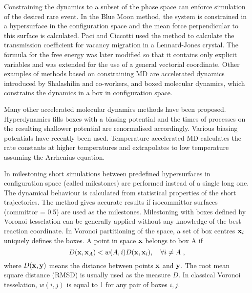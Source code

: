 Constraining the dynamics to a subset of the phase space can enforce simulation of the desired rare event.
In the Blue Moon method,\cite{Carter1989, Paci1991} the system is constrained in a hypersurface in the configuration space and the mean force perpendicular to this surface is calculated.
Paci and Ciccotti used the method to calculate the transmission coefficient for vacancy migration in a Lennard-Jones crystal.\cite{Paci1992}
The formula for the free energy was later modified so that it contains only explicit variables\cite{Sprik1998} and was extended for the use of a general vectorial coordinate.\cite{Ciccotti2005}
Other examples of methods based on constraining MD are accelerated dynamics\cite{Martinez-Nunez2006} introduced by Shalashilin and co-workers, and boxed molecular dynamics,\cite{Glowacki2009} which constrains the dynamics in a box in configuration space.

Many other accelerated molecular dynamics methods have been proposed.
Hyperdynamics\cite{Voter1997} fills boxes with a biasing potential and the times of processes on the resulting shallower potential are renormalised accordingly.
Various biasing potentials have recently been used.\cite{Hamelberg2004, Doshi2012}
Temperature accelerated MD\cite{Sorensen2000} calculates the rate constants at higher temperatures and extrapolates to low temperature assuming the Arrhenius equation.

In milestoning\cite{Faradjian2004} short simulations between predefined hypersurfaces in configuration space (called milestones) are performed instead of a single long one.
The dynamical behaviour is calculated from statistical properties of the short trajectories.
The method gives accurate results if isocommittor surfaces (committor = 0.5) are used as the milestones.\cite{Vanden-Eijnden2008}
Milestoning with boxes defined by Voronoi tesselation\cite{Vanden-Eijnden2009} can be generally applied without any knowledge of the best reaction coordinate.
In Voronoi partitioning of the space, a set of box centres ${\bf x}_i$ uniquely defines the boxes.
A point in space ${\bf x}$ belongs to box A if
\begin{equation} 
\label{eq:voronoi}
D({\bf x},{\bf x}_A) < w(A,i) D({\bf x},{\bf x}_i), ~~~\forall i \neq A ~,
\end{equation}
where $D({\bf x},{\bf y})$ means the distance between points ${\bf x}$ and ${\bf y}$.
The root mean square distance (RMSD) is usually used as the measure $D$.
In classical Voronoi tesselation, $w(i,j)$ is equal to 1 for any pair of boxes $i,j$.

